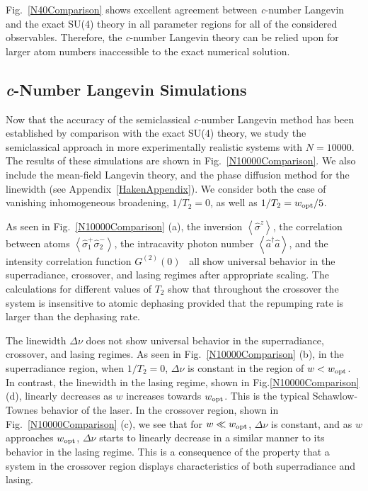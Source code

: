 \documentclass[aps,
twocolumn,
showpacs,
superscriptaddress,groupedaddress]{revtex4}
\begin{document}
Fig.~\ref{N40Comparison} shows excellent agreement between {\it
  c}-number Langevin and the exact SU(4) theory in all parameter
regions for all of the considered observables.  Therefore, the {\it
  c}-number Langevin theory can be relied upon for larger atom numbers
inaccessible to the exact numerical solution.

\subsection{{\it c}-Number Langevin Simulations}

Now that the accuracy of the semiclassical {\it c}-number Langevin
method has been established by comparison with the exact SU(4) theory,
we study the semiclassical approach in more experimentally realistic
systems with $N=10000$. The results of these simulations are shown in
Fig.~\ref{N10000Comparison}.  We also include the mean-field Langevin
theory, and the phase diffusion method for the linewidth (see
Appendix~\ref{HakenAppendix}). We consider both the case of vanishing
inhomogeneous broadening, $1/T_2=0$, as well as $1/T_2=w_{\rm opt}/5$.

As seen in Fig.~\ref{N10000Comparison} (a), the inversion
$\left<\hat{\sigma}^{z}\right>$, the correlation between atoms
$\left<\hat{\sigma}_{1}^{+} \hat{\sigma}_{2}^{-}\right>$, the
intracavity photon number $\left<\hat{a}^{\dagger}\hat{a}\right>$, and
the intensity correlation function
$G^{(2)}(0)$~\cite{meystre2007elements} all show universal behavior in
the superradiance, crossover, and lasing regimes after appropriate
scaling.  The calculations for different values of $T_2$ show that
throughout the crossover the system is insensitive to atomic dephasing
provided that the repumping rate is larger than the dephasing rate.

The linewidth $\Delta \nu$ does not show universal behavior in the
superradiance, crossover, and lasing regimes. As seen in
Fig.~\ref{N10000Comparison} (b), in the superradiance region, when
$1/T_2=0$, $\Delta \nu$ is constant in the region of $w<w_{\rm opt}$.
In contrast, the linewidth in the lasing regime, shown in
Fig.\ref{N10000Comparison} (d), linearly decreases as $w$ increases
towards $w_{\rm opt}$. This is the typical Schawlow-Townes behavior of
the laser. In the crossover region, shown in
Fig.~\ref{N10000Comparison} (c), we see that for $w\ll w_{\rm opt}$,
$\Delta \nu$ is constant, and as $w$ approaches $w_{\rm opt}$,
$\Delta \nu$ starts to linearly decrease in a similar manner to its
behavior in the lasing regime. This is a consequence of the property
that a system in the crossover region displays characteristics of both
superradiance and lasing.
\end{document}
